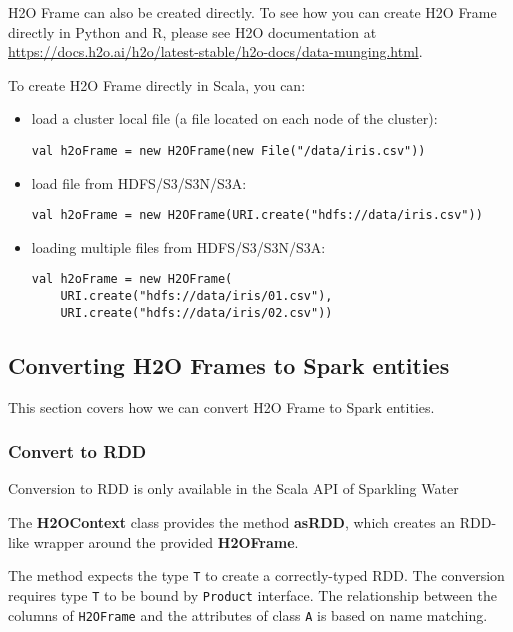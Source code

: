 \documentclass{standalone}
\begin{document}
    H2O Frame can also be created directly. To see how you can create H2O Frame directly in Python and R, please see
    H2O documentation at \url{https://docs.h2o.ai/h2o/latest-stable/h2o-docs/data-munging.html}.

    To create H2O Frame directly in Scala, you can:

    \begin{itemize}
        \item load a cluster local file (a file located on each node of the cluster):
        \begin{lstlisting}[style=Scala]
val h2oFrame = new H2OFrame(new File("/data/iris.csv"))
        \end{lstlisting}
        \item load file from HDFS/S3/S3N/S3A:
        \begin{lstlisting}[style=Scala]
val h2oFrame = new H2OFrame(URI.create("hdfs://data/iris.csv"))
        \end{lstlisting}
        \item loading multiple files from HDFS/S3/S3N/S3A:
        \begin{lstlisting}[style=Scala]
val h2oFrame = new H2OFrame(
    URI.create("hdfs://data/iris/01.csv"),
    URI.create("hdfs://data/iris/02.csv"))
        \end{lstlisting}
    \end{itemize}

    \subsection{Converting H2O Frames to Spark entities}

    This section covers how we can convert H2O Frame to Spark entities.

    \subsubsection{Convert to RDD}

    Conversion to RDD is only available in the Scala API of Sparkling Water

    The \textbf{H2OContext} class provides the method \textbf{asRDD}, which creates an RDD-like wrapper around the
    provided \textbf{H2OFrame}.

    The method expects the type \texttt{T} to create a correctly-typed RDD. The conversion requires type \texttt{T} to
    be bound by \texttt{Product} interface. The relationship between the columns of \texttt{H2OFrame} and the
    attributes of class \texttt{A} is based on name matching.
\end{document}
